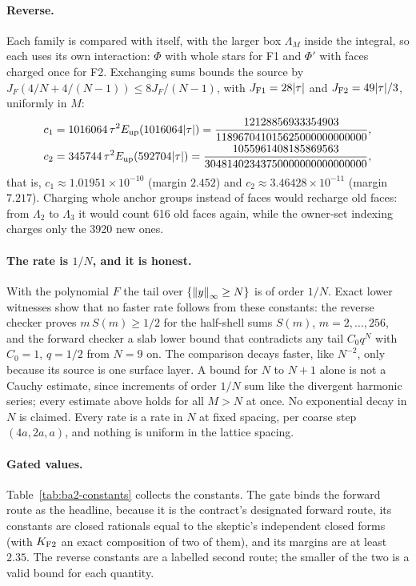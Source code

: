 \paragraph{Reverse.} Each family is compared with itself, with the larger box
$\Lambda_M$ inside the integral, so each uses its own interaction: $\Phi$ with
whole stars for F1 and $\Phi'$ with faces charged once for F2. Exchanging
sums bounds the source by $J_F(4/N+4/(N-1))\le8J_F/(N-1)$, with
$J_{\rm F1}=28|\tau|$ and $J_{\rm F2}=49|\tau|/3$, uniformly in $M$:
\begin{equation}
 \begin{aligned}
 c_1&=1016064\,\tau^2E_{\rm up}(1016064|\tau|)
 =\frac{12128856933354903}{118967041015625000000000000},\\
 c_2&=345744\,\tau^2E_{\rm up}(592704|\tau|)
 =\frac{1055961408185869563}{30481402343750000000000000000},
 \end{aligned}
 \label{eq:ba2-cauchy-rev}
\end{equation}
that is, $c_1\approx1.01951\times10^{-10}$ (margin $2.452$) and
$c_2\approx3.46428\times10^{-11}$ (margin $7.217$). Charging whole anchor
groups instead of faces would recharge old faces: from $\Lambda_2$ to
$\Lambda_3$ it would count 616 old faces again, while the owner-set indexing
charges only the 3920 new ones.

\paragraph{The rate is $1/N$, and it is honest.} With the polynomial $F$ the
tail over $\{\left\lVert y\right\rVert_\infty\ge N\}$ is of order $1/N$. Exact lower witnesses
show that no faster rate follows from these constants: the reverse checker
proves $m\,S(m)\ge1/2$ for the half-shell sums $S(m)$, $m=2,\ldots,256$, and
the forward checker a slab lower bound that contradicts any tail $C_0q^N$
with $C_0=1$, $q=1/2$ from $N=9$ on. The comparison decays faster, like
$N^{-2}$, only because its source is one surface layer. A bound for $N$ to
$N+1$ alone is not a Cauchy estimate, since increments of order $1/N$ sum
like the divergent harmonic series; every estimate above holds for all $M>N$
at once. No exponential decay in $N$ is claimed. Every rate is a rate in $N$
at fixed spacing, per coarse step $(4a,2a,a)$, and nothing is uniform in the
lattice spacing.

\paragraph{Gated values.} Table~\ref{tab:ba2-constants} collects the
constants. The gate binds the forward route as the headline, because it is
the contract's designated forward route, its constants are closed rationals
equal to the skeptic's independent closed forms (with $K_{\rm F2}$ an exact
composition of two of them), and its margins are at least $2.35$. The reverse
constants are a labelled second route; the smaller of the two is a valid bound
for each quantity.

